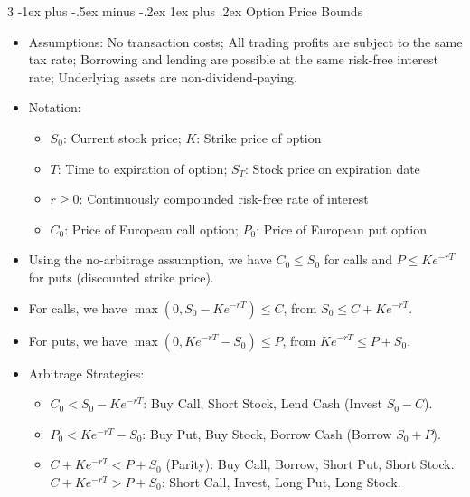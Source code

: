 \documentclass[10pt, landscape]{article}
\makeatletter
\renewcommand{\subsection}{\@startsection{subsection}{3}{0mm}%
                                {-1ex plus -.5ex minus -.2ex}%
                                {1ex plus .2ex}%
                                {\normalfont\small\bfseries}}%
\makeatother
\begin{document}
\begin{multicols*}{3}
\subsection{Option Price Bounds}
\begin{itemize}
    \item Assumptions: No transaction costs; All trading profits are subject to the same tax rate; Borrowing and lending are possible at the same risk-free interest rate; Underlying assets are non-dividend-paying.
    \item Notation:
    \begin{itemize}
        \item $S_0$: Current stock price; $K$: Strike price of option
        \item $T$: Time to expiration of option; $S_T$: Stock price on expiration date
        \item $r \geq 0$: Continuously compounded risk-free rate of interest
        \item $C_0$: Price of European call option; $P_0$: Price of European put option
    \end{itemize}
    \item Using the no-arbitrage assumption, we have $C_0 \leq S_0$ for calls and $P \leq Ke^{-rT}$ for puts (discounted strike price).
    \item For calls, we have $\max(0, S_0-Ke^{-rT}) \leq C$, from $S_0 \leq C + Ke^{-rT}$.
    \item For puts, we have $\max(0, Ke^{-rT}-S_0) \leq P$, from $Ke^{-rT} \leq P+S_0$.
    \item Arbitrage Strategies:
    \begin{itemize}
        \item $C_0 < S_0 - Ke^{-rT}$: Buy Call, Short Stock, Lend Cash (Invest $S_0-C$).
        \item $P_0 < Ke^{-rT} - S_0$: Buy Put, Buy Stock, Borrow Cash (Borrow $S_0+P$).
        \item $C+Ke^{-rT} < P+S_0$ (Parity): Buy Call, Borrow, Short Put, Short Stock. $C+Ke^{-rT} > P+S_0$: Short Call, Invest, Long Put, Long Stock.
    \end{itemize}
\end{itemize}


\end{multicols*}
\end{document}
